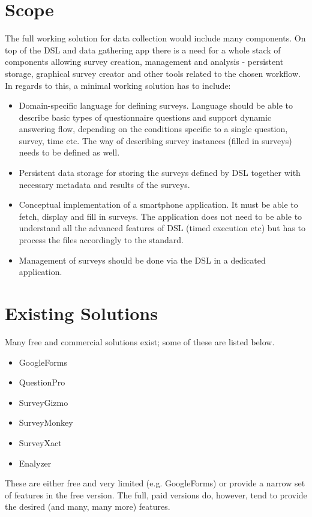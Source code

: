 \section{Scope}
\label{sec:Scope}
The full working solution for data collection would include many components. On top of the DSL and data gathering app there is a need for a whole stack of components allowing survey creation, management and analysis - persistent storage, graphical survey creator and other tools related to the chosen workflow. In regards to this, a minimal working solution has to include:
\begin{itemize}
\item Domain-specific language for defining surveys. Language should be able to describe basic types of questionnaire questions and support dynamic answering flow, depending on the conditions specific to a single question, survey, time etc. The way of describing survey instances (filled in surveys) needs to be defined as well.
\item Persistent data storage for storing the surveys defined by DSL together with necessary metadata and results of the surveys.
\item Conceptual implementation of a smartphone application. It must be able to fetch, display and fill in surveys. The application does not need to be able to understand all the advanced features of DSL (timed execution etc) but has to process the files accordingly to the standard.
\item Management of surveys should be done via the DSL in a dedicated application.
\end{itemize}

\section{Existing Solutions}
\label{sec:existingsolutions}
Many free and commercial solutions exist; some of these are listed below.
\begin{itemize}
\item GoogleForms
\item QuestionPro
\item SurveyGizmo
\item SurveyMonkey
\item SurveyXact
\item Enalyzer
\end{itemize}
  
These are either free and very limited (e.g. GoogleForms) or provide a narrow set of features in the free version. The full, paid versions do, however, tend to provide the desired (and many, many more) features.